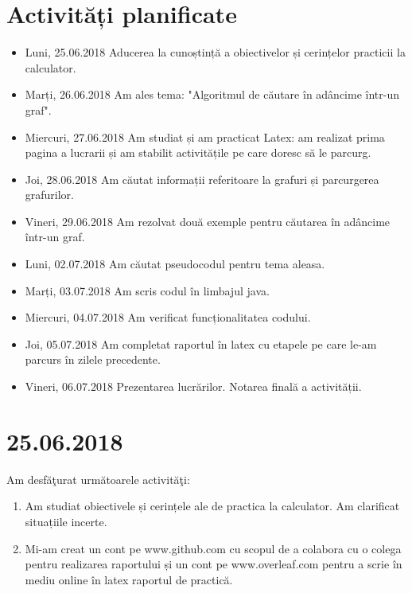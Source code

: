 \documentclass{report}
\begin{document}
\chapter{Activități planificate}
\begin{itemize}
\item  Luni, 25.06.2018 \newline
Aducerea la cunoștință a obiectivelor și cerințelor practicii la calculator.
\item  Marți, 26.06.2018 \newline
Am ales tema: "Algoritmul de căutare în adâncime într-un graf".
\item  Miercuri, 27.06.2018 \newline
Am studiat și am practicat Latex: am realizat prima pagina a lucrarii și am stabilit activitățile pe care doresc să le parcurg.
\item  Joi, 28.06.2018 \newline
Am căutat informații referitoare la grafuri și parcurgerea grafurilor.
\item  Vineri, 29.06.2018  \newline
Am rezolvat două exemple pentru căutarea în adâncime  într-un graf.
\item  Luni, 02.07.2018  \newline
Am căutat pseudocodul pentru tema aleasa.
\item  Marți, 03.07.2018  \newline
Am scris codul în limbajul java.
\item  Miercuri, 04.07.2018  \newline
Am verificat funcționalitatea codului. 
\item  Joi, 05.07.2018  \newline
Am completat raportul în latex cu etapele pe care le-am parcurs în zilele precedente.
\item  Vineri, 06.07.2018  \newline
Prezentarea lucrărilor.
Notarea finală a activității.
\end{itemize}


\chapter{25.06.2018}
Am desfăţurat următoarele activităţi:
\begin{enumerate}
\item Am studiat obiectivele și cerințele ale de practica la calculator. Am clarificat situațiile incerte.
\item Mi-am creat un cont pe www.github.com cu scopul de a colabora cu o colega pentru realizarea raportului și un cont pe www.overleaf.com pentru a scrie în mediu online în latex raportul de practică.
\end{enumerate}
\end{document}
